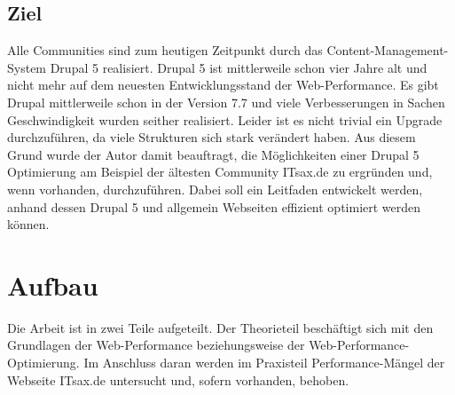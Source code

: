 \subsection{Ziel}
Alle Communities sind zum heutigen Zeitpunkt durch das Content-Management-System Drupal 5 realisiert. Drupal 5 ist mittlerweile schon vier Jahre alt und nicht mehr auf dem neuesten Entwicklungsstand der Web-Performance. Es gibt Drupal mittlerweile schon in der Version 7.7 und viele Verbesserungen in Sachen Geschwindigkeit wurden seither realisiert. Leider ist es nicht trivial ein Upgrade durchzuführen, da viele Strukturen sich stark verändert haben. Aus diesem Grund wurde der Autor damit beauftragt, die Möglichkeiten einer Drupal 5 Optimierung am Beispiel der ältesten Community ITsax.de zu ergründen und, wenn vorhanden, durchzuführen. Dabei soll ein Leitfaden entwickelt werden, anhand dessen Drupal 5 und allgemein Webseiten effizient optimiert werden können.

\section{Aufbau}
Die Arbeit ist in zwei Teile aufgeteilt. Der Theorieteil beschäftigt sich mit den Grundlagen der Web-Performance beziehungsweise der Web-Performance-Optimierung. Im Anschluss daran werden im Praxisteil Performance-Mängel der Webseite ITsax.de untersucht und, sofern vorhanden, behoben. 
